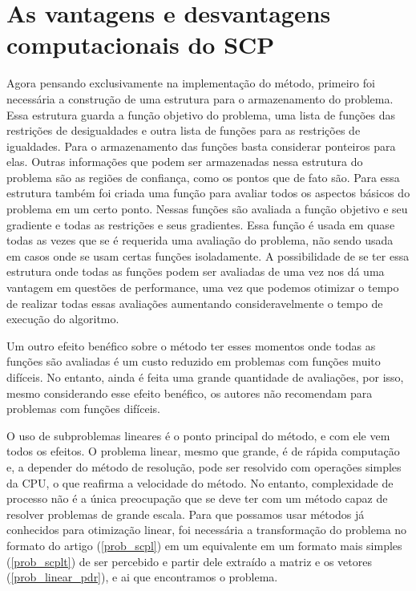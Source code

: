 \section{As vantagens e desvantagens computacionais do SCP}

\noindent
Agora pensando exclusivamente na implementação do método, primeiro foi necessária
a construção de uma estrutura para o armazenamento do problema. Essa estrutura guarda
a função objetivo do problema, uma lista de funções das restrições de desigualdades e
outra lista de funções para as restrições de igualdades. Para o armazenamento das
funções basta considerar ponteiros para elas. Outras informações que podem ser
armazenadas nessa estrutura do problema são as regiões de confiança, como os
pontos que de fato são. Para essa estrutura também foi criada uma função
para avaliar todos os aspectos básicos do problema em um certo ponto. Nessas
funções são avaliada a função objetivo e seu gradiente e todas as restrições e seus
gradientes. Essa função é usada em quase todas as vezes que se é requerida uma avaliação
do problema, não sendo usada em casos onde se usam certas funções isoladamente. A
possibilidade de se ter essa estrutura onde todas as funções podem ser avaliadas de uma vez
nos dá uma vantagem em questões de performance, uma vez que podemos otimizar o tempo de
realizar todas essas avaliações aumentando consideravelmente o tempo de execução do algoritmo.

Um outro efeito benéfico sobre o método ter esses momentos onde todas as funções são
avaliadas é um custo reduzido em problemas com funções muito difíceis. No entanto, ainda
é feita uma grande quantidade de avaliações, por isso, mesmo considerando esse efeito
benéfico, os autores não recomendam para problemas com funções difíceis.

O uso de subproblemas lineares é o ponto principal do método, e com ele vem todos
os efeitos. O problema linear, mesmo que grande, é de rápida computação e, a depender
do método de resolução, pode ser resolvido com operações simples da CPU, o que reafirma
a velocidade do método. No entanto, complexidade de processo não é a única preocupação
que se deve ter com um método capaz de resolver problemas de grande escala. Para que
possamos usar métodos já conhecidos para otimização linear, foi necessária a transformação
do problema no formato do artigo (\ref{prob_scpl}) em um equivalente em um formato mais
simples (\ref{prob_scplt}) de ser percebido e partir dele extraído a matriz
e os vetores (\ref{prob_linear_pdr}), e ai que encontramos o problema.

